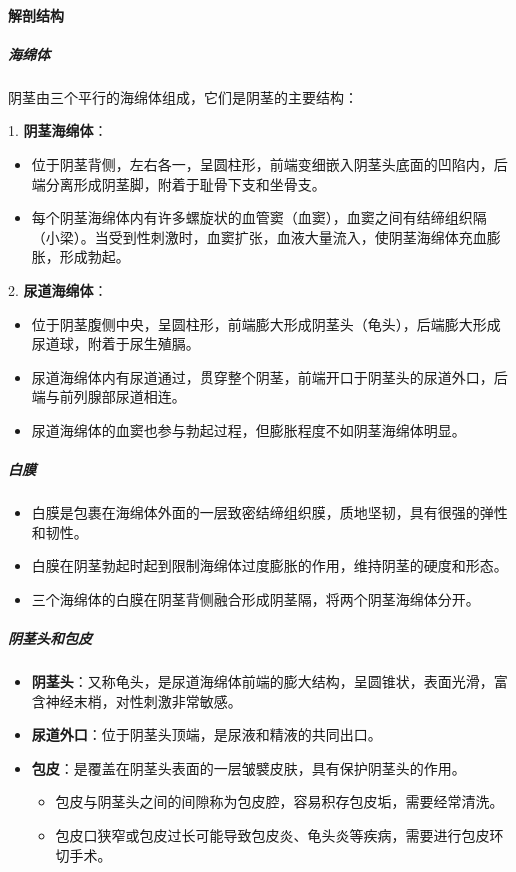 \paragraph{解剖结构}

\subparagraph{海绵体}
阴茎由三个平行的海绵体组成，它们是阴茎的主要结构：

1. \textbf{阴茎海绵体}：
  \begin{itemize}
  \item 位于阴茎背侧，左右各一，呈圆柱形，前端变细嵌入阴茎头底面的凹陷内，后端分离形成阴茎脚，附着于耻骨下支和坐骨支。
  \item 每个阴茎海绵体内有许多螺旋状的血管窦（血窦），血窦之间有结缔组织隔（小梁）。当受到性刺激时，血窦扩张，血液大量流入，使阴茎海绵体充血膨胀，形成勃起。
  \end{itemize}

2. \textbf{尿道海绵体}：
  \begin{itemize}
  \item 位于阴茎腹侧中央，呈圆柱形，前端膨大形成阴茎头（龟头），后端膨大形成尿道球，附着于尿生殖膈。
  \item 尿道海绵体内有尿道通过，贯穿整个阴茎，前端开口于阴茎头的尿道外口，后端与前列腺部尿道相连。
  \item 尿道海绵体的血窦也参与勃起过程，但膨胀程度不如阴茎海绵体明显。
  \end{itemize}

\subparagraph{白膜}
\begin{itemize}
\item 白膜是包裹在海绵体外面的一层致密结缔组织膜，质地坚韧，具有很强的弹性和韧性。
\item 白膜在阴茎勃起时起到限制海绵体过度膨胀的作用，维持阴茎的硬度和形态。
\item 三个海绵体的白膜在阴茎背侧融合形成阴茎隔，将两个阴茎海绵体分开。
\end{itemize}

\subparagraph{阴茎头和包皮}
\begin{itemize}
\item \textbf{阴茎头}：又称龟头，是尿道海绵体前端的膨大结构，呈圆锥状，表面光滑，富含神经末梢，对性刺激非常敏感。
\item \textbf{尿道外口}：位于阴茎头顶端，是尿液和精液的共同出口。
\item \textbf{包皮}：是覆盖在阴茎头表面的一层皱襞皮肤，具有保护阴茎头的作用。
  \begin{itemize}
  \item 包皮与阴茎头之间的间隙称为包皮腔，容易积存包皮垢，需要经常清洗。
  \item 包皮口狭窄或包皮过长可能导致包皮炎、龟头炎等疾病，需要进行包皮环切手术。
  \end{itemize}
\end{itemize}

